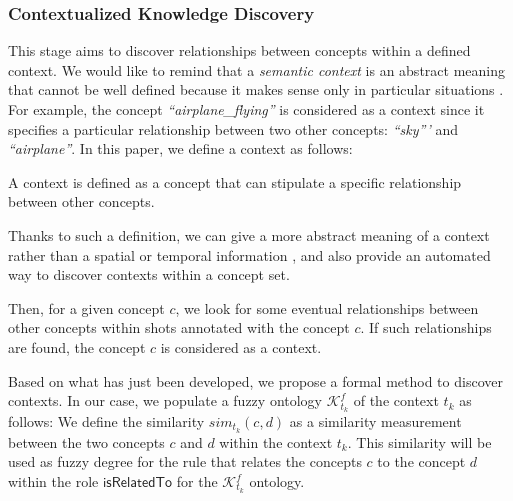 		\subsubsection{Contextualized Knowledge Discovery}
		This stage aims to discover relationships between concepts within a defined context.
		We would like to remind that a \emph{semantic context} is an abstract meaning that cannot be well defined because 
		it makes sense only in particular situations \cite{Elleuch2011, Ksentini2012}. 
		For example, the concept \emph{``airplane\_{}flying''} is considered as
		a context since it specifies a particular relationship between two other
		concepts: \emph{``sky'''} and \emph{``airplane''}. 
		In this paper, we define a context as follows:
		\begin{definition}
			A context is defined as a concept that can stipulate a specific relationship 
			between other concepts.
		\end{definition}
		Thanks to such a definition, we can give a more abstract meaning of a context
		rather than a spatial or temporal information \cite{Brilhault2009},
		and also provide an automated way to discover contexts within a concept set.
		
		Then, for a given concept $c$, we look for some eventual relationships
		between other concepts within shots annotated with the concept $c$. 
		If such relationships are found, the concept $c$ is considered as a context.

		Based on what has just been developed, we propose a formal method to discover contexts. 
		In our case, we populate a fuzzy ontology $\mathcal{K}^{f}_{t_{k}}$ of the context $t_{k}$ as follows:
		We define the similarity $sim_{t_{k}}(c, d)$ as a similarity measurement between the 
		two concepts 
		$c$ and $d$ within the context $t_{k}$. This similarity will be used as fuzzy degree 
		for the rule that relates the concepts $c$ to the concept $d$ within the role 
		$\mathsf{isRelatedTo}$ for the $\mathcal{K}^{f}_{t_{k}}$ ontology.

